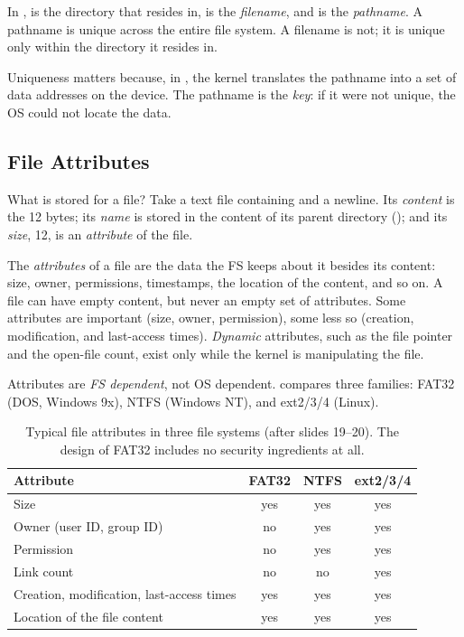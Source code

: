 \begin{definition}
  In ,  is the directory that  resides in,  is the \emph{filename}, and  is the \emph{pathname}. A pathname is unique across the entire file system. A filename is not; it is unique only within the directory it resides in.
\end{definition}

Uniqueness matters because, in , the kernel translates the pathname into a set of data addresses on the device. The pathname is the \emph{key}: if it were not unique, the OS could not locate the data.

\subsection{File Attributes}

What is stored for a file? Take a text file  containing  and a newline. Its \emph{content} is the 12 bytes; its \emph{name} is stored in the content of its parent directory (); and its \emph{size}, 12, is an \emph{attribute} of the file.

\begin{definition}
  The \emph{attributes} of a file are the data the FS keeps about it besides its content: size, owner, permissions, timestamps, the location of the content, and so on. A file can have empty content, but never an empty set of attributes. Some attributes are important (size, owner, permission), some less so (creation, modification, and last-access times). \emph{Dynamic} attributes, such as the file pointer and the open-file count, exist only while the kernel is manipulating the file.
\end{definition}

Attributes are \emph{FS dependent}, not OS dependent.  compares three families: FAT32 (DOS, Windows 9x), NTFS (Windows NT), and ext2/3/4 (Linux).

\begin{table}[htbp]
\centering
\small
\begin{tabular}{lccc}
  \toprule
  Attribute & FAT32 & NTFS & ext2/3/4 \\
  \midrule
  Size & yes & yes & yes \\
  Owner (user ID, group ID) & no & yes & yes \\
  Permission & no & yes & yes \\
  Link count & no & no & yes \\
  Creation, modification, last-access times & yes & yes & yes \\
  Location of the file content & yes & yes & yes \\
  \bottomrule
\end{tabular}
\caption{Typical file attributes in three file systems (after slides 19--20). The design of FAT32 includes no security ingredients at all.}
\label{tab:attrs}
\end{table}

